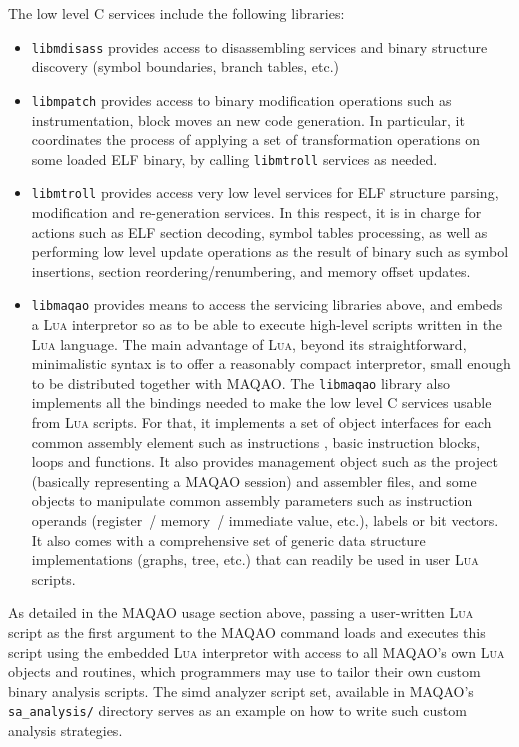\documentclass[11pt, a4paper, twoside]{montblanc2}
\def\lua{\textsc{Lua}\xspace}
\begin{document}
The low level C services include the following libraries:
\begin{itemize}
  \item \texttt{libmdisass} provides access to disassembling services and binary 
    structure discovery (symbol boundaries, branch tables, etc.)

  \item \texttt{libmpatch}  provides access to binary modification operations 
    such as instrumentation, block moves an new code generation. In particular, 
    it coordinates the process of applying a set of transformation operations on 
    some loaded ELF binary, by calling \texttt{libmtroll} services as needed.

  \item \texttt{libmtroll} provides access very low level services for ELF 
    structure parsing, modification and re-generation services. In this respect, 
    it is in charge for actions such as ELF section decoding, symbol tables 
    processing, as well as performing low level update operations as the result 
    of binary such as symbol insertions, section reordering/renumbering, and 
    memory offset updates.

  \item \texttt{libmaqao} provides means to access the servicing libraries 
    above, and embeds a \lua interpretor so as to be able to execute high-level 
    scripts written in the \lua language. The main advantage of \lua, beyond its 
    straightforward, minimalistic syntax is to offer a reasonably compact 
    interpretor, small enough to be distributed together with MAQAO. The 
    \texttt{libmaqao} library also implements all the bindings needed to make 
    the low level C services usable from \lua scripts. For that, it implements a 
    set of object interfaces for each common assembly element such as 
    instructions , basic instruction blocks, loops and functions. It also 
    provides management object such as the project (basically representing a 
    MAQAO session) and assembler files, and some objects to manipulate common 
    assembly parameters such as instruction operands (register~/ memory~/ 
    immediate value, etc.), labels or bit vectors. It also comes with a 
    comprehensive set of generic data structure implementations (graphs, tree, 
    etc.) that can readily be used in user \lua scripts.

\end{itemize}

As detailed in the MAQAO usage section above, passing a user-written \lua script 
as the first argument to the MAQAO command loads and executes this script using 
the embedded \lua interpretor with access to all MAQAO's own \lua objects and 
routines, which programmers may use to tailor their own custom binary analysis 
scripts. The simd analyzer script set, available in MAQAO's \verb|sa_analysis/| 
directory serves as an example on how to write such custom analysis strategies.
\end{document}
